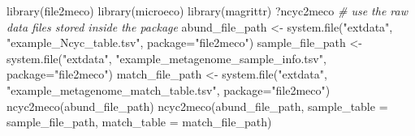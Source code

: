 \documentclass[
]{book}
\newenvironment{Shaded}{\begin{snugshade}}{\end{snugshade}}
\newcommand{\AttributeTok}[1]{\textcolor[rgb]{0.77,0.63,0.00}{#1}}
\newcommand{\CommentTok}[1]{\textcolor[rgb]{0.56,0.35,0.01}{\textit{#1}}}
\newcommand{\FunctionTok}[1]{\textcolor[rgb]{0.00,0.00,0.00}{#1}}
\newcommand{\NormalTok}[1]{#1}
\newcommand{\OtherTok}[1]{\textcolor[rgb]{0.56,0.35,0.01}{#1}}
\newcommand{\StringTok}[1]{\textcolor[rgb]{0.31,0.60,0.02}{#1}}
\begin{document}
\begin{Shaded}
\begin{Highlighting}[]
\FunctionTok{library}\NormalTok{(file2meco)}
\FunctionTok{library}\NormalTok{(microeco)}
\FunctionTok{library}\NormalTok{(magrittr)}
\NormalTok{?ncyc2meco}
\CommentTok{\# use the raw data files stored inside the package}
\NormalTok{abund\_file\_path }\OtherTok{\textless{}{-}} \FunctionTok{system.file}\NormalTok{(}\StringTok{"extdata"}\NormalTok{, }\StringTok{"example\_Ncyc\_table.tsv"}\NormalTok{, }\AttributeTok{package=}\StringTok{"file2meco"}\NormalTok{)}
\NormalTok{sample\_file\_path }\OtherTok{\textless{}{-}} \FunctionTok{system.file}\NormalTok{(}\StringTok{"extdata"}\NormalTok{, }\StringTok{"example\_metagenome\_sample\_info.tsv"}\NormalTok{, }\AttributeTok{package=}\StringTok{"file2meco"}\NormalTok{)}
\NormalTok{match\_file\_path }\OtherTok{\textless{}{-}} \FunctionTok{system.file}\NormalTok{(}\StringTok{"extdata"}\NormalTok{, }\StringTok{"example\_metagenome\_match\_table.tsv"}\NormalTok{, }\AttributeTok{package=}\StringTok{"file2meco"}\NormalTok{)}
\FunctionTok{ncyc2meco}\NormalTok{(abund\_file\_path)}
\FunctionTok{ncyc2meco}\NormalTok{(abund\_file\_path, }\AttributeTok{sample\_table =}\NormalTok{ sample\_file\_path, }\AttributeTok{match\_table =}\NormalTok{ match\_file\_path)}
\end{Highlighting}
\end{Shaded}
\end{document}

